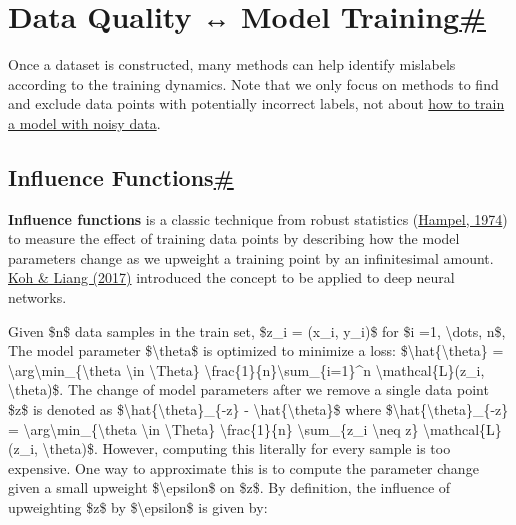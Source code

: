 \section{\texorpdfstring{Data Quality ↔ Model Training\hyperref[data-quality--model-training]{\#}}{Data Quality ↔ Model Training\#}}\label{data-quality--model-training}

Once a dataset is constructed, many methods can help identify mislabels according to the training dynamics. Note that we only focus on methods to find and exclude data points with potentially incorrect labels, not about \href{https://lilianweng.github.io/posts/2022-04-15-data-gen/\#training-with-noisy-data}{how to train a model with noisy data}.

\subsection{\texorpdfstring{Influence Functions\hyperref[influence-functions]{\#}}{Influence Functions\#}}\label{influence-functions}

\textbf{Influence functions} is a classic technique from robust statistics (\href{https://www.jstor.org/stable/2285666}{Hampel, 1974}) to measure the effect of training data points by describing how the model parameters change as we upweight a training point by an infinitesimal amount. \href{https://arxiv.org/abs/1703.04730}{Koh \& Liang (2017)} introduced the concept to be applied to deep neural networks.

Given \$n\$ data samples in the train set, \$z\_i = (x\_i, y\_i)\$ for \$i =1, \textbackslash dots, n\$, The model parameter \$\textbackslash theta\$ is optimized to minimize a loss: \$\textbackslash hat\{\textbackslash theta\} = \textbackslash arg\textbackslash min\_\{\textbackslash theta \textbackslash in \textbackslash Theta\} \textbackslash frac\{1\}\{n\}\textbackslash sum\_\{i=1\}\^{}n \textbackslash mathcal\{L\}(z\_i, \textbackslash theta)\$. The change of model parameters after we remove a single data point \$z\$ is denoted as \$\textbackslash hat\{\textbackslash theta\}\_\{-z\} - \textbackslash hat\{\textbackslash theta\}\$ where \$\textbackslash hat\{\textbackslash theta\}\_\{-z\} = \textbackslash arg\textbackslash min\_\{\textbackslash theta \textbackslash in \textbackslash Theta\} \textbackslash frac\{1\}\{n\} \textbackslash sum\_\{z\_i \textbackslash neq z\} \textbackslash mathcal\{L\}(z\_i, \textbackslash theta)\$. However, computing this literally for every sample is too expensive. One way to approximate this is to compute the parameter change given a small upweight \$\textbackslash epsilon\$ on \$z\$. By definition, the influence of upweighting \$z\$ by \$\textbackslash epsilon\$ is given by:

